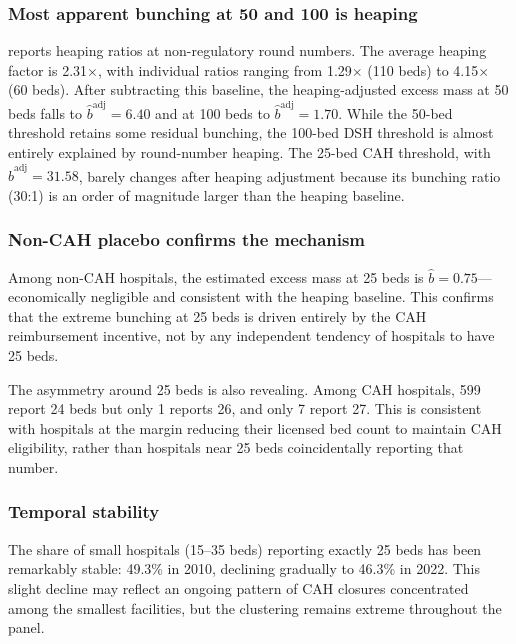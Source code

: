 \documentclass[12pt]{article}
\begin{document}


\subsubsection*{Most apparent bunching at 50 and 100 is heaping}   reports heaping ratios at non-regulatory round numbers. The average heaping factor is 2.31$\times$, with individual ratios ranging from 1.29$\times$ (110 beds) to 4.15$\times$ (60 beds). After subtracting this baseline, the heaping-adjusted excess mass at 50 beds falls to $\hat{b}^{\text{adj}} = 6.40$ and at 100 beds to $\hat{b}^{\text{adj}} = 1.70$. While the 50-bed threshold retains some residual bunching, the 100-bed DSH threshold is almost entirely explained by round-number heaping. The 25-bed CAH threshold, with $\hat{b}^{\text{adj}} = 31.58$, barely changes after heaping adjustment because its bunching ratio (30:1) is an order of magnitude larger than the heaping baseline.



\subsubsection*{Non-CAH placebo confirms the mechanism}  Among non-CAH hospitals, the estimated excess mass at 25 beds is $\hat{b} = 0.75$---economically negligible and consistent with the heaping baseline. This confirms that the extreme bunching at 25 beds is driven entirely by the CAH reimbursement incentive, not by any independent tendency of hospitals to have 25 beds.

The asymmetry around 25 beds is also revealing. Among CAH hospitals, 599 report 24 beds but only 1 reports 26, and only 7 report 27. This is consistent with hospitals at the margin reducing their licensed bed count to maintain CAH eligibility, rather than hospitals near 25 beds coincidentally reporting that number.

\subsubsection*{Temporal stability}  The share of small hospitals (15--35 beds) reporting exactly 25 beds has been remarkably stable: 49.3\% in 2010, declining gradually to 46.3\% in 2022. This slight decline may reflect an ongoing pattern of CAH closures concentrated among the smallest facilities, but the clustering remains extreme throughout the panel.
\end{document}
